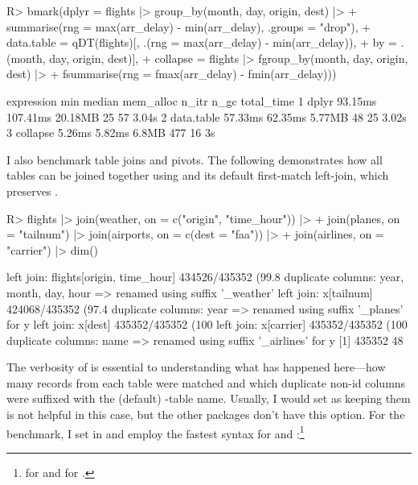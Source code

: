 \documentclass[nojss]{jss} %
\newcommand{\fct}[1]{\code{#1()}}
\begin{document}
%
\begin{Schunk}
\begin{Sinput}
R> bmark(dplyr = flights |> group_by(month, day, origin, dest) |>
+      summarise(rng = max(arr_delay) - min(arr_delay), .groups = "drop"),
+    data.table = qDT(flights)[, .(rng = max(arr_delay) - min(arr_delay)),
+                              by = .(month, day, origin, dest)],
+    collapse = flights |> fgroup_by(month, day, origin, dest) |>
+      fsummarise(rng = fmax(arr_delay) - fmin(arr_delay)))
\end{Sinput}
\begin{Soutput}
  expression     min   median mem_alloc n_itr n_gc total_time
1      dplyr 93.15ms 107.41ms   20.18MB    25   57      3.04s
2 data.table 57.33ms  62.35ms    5.77MB    48   25      3.02s
3   collapse  5.26ms   5.82ms     6.8MB   477   16         3s
\end{Soutput}
\end{Schunk}
%
I also benchmark table joins and pivots. The following demonstrates how all tables can be joined together using  and its default first-match left-join, which preserves .
%
\begin{Code}
R> flights |> join(weather, on = c("origin", "time_hour")) |>
+    join(planes, on = "tailnum") |> join(airports, on = c(dest = "faa")) |>
+    join(airlines, on = "carrier") |> dim()
\end{Code}
\begin{Schunk}
\begin{Soutput}
left join: flights[origin, time_hour] 434526/435352 (99.8%) <21.94:1st> weat
duplicate columns: year, month, day, hour => renamed using suffix '_weather'
left join: x[tailnum] 424068/435352 (97.4%) <87.62:1st> planes[tailnum] 4840
duplicate columns: year => renamed using suffix '_planes' for y
left join: x[dest] 435352/435352 (100%) <3689.42:1st> airports[faa] 118/1255
left join: x[carrier] 435352/435352 (100%) <31096.57:1st> airlines[carrier] 
duplicate columns: name => renamed using suffix '_airlines' for y
[1] 435352     48
\end{Soutput}
\end{Schunk}
%
The verbosity of \fct{join} is essential to understanding what has happened here---how many records from each table were matched and which duplicate non-id columns were suffixed with the (default) -table name. Usually, I would set  as keeping them is not helpful in this case, but the other packages don't have this option. For the benchmark, I set  in  and employ the fastest syntax for  and :\footnote{ for  and  for .}
\end{document}
